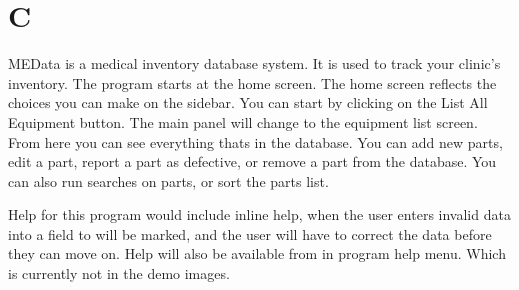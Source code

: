 \documentclass[12pt]{report}
\begin{document}
\chapter*{C}

MEData is a medical inventory database system.  It is used to track your
clinic's inventory.  The program starts at the home screen.  The home screen
reflects the choices you can make on the sidebar.  You can start by 
clicking on the List All Equipment button.  The main panel will change to 
the equipment list screen.  From here you can see everything thats in the
database.  You can add new parts, edit a part, report a part as defective,
or remove a part from the database.  You can also run searches on parts, or
sort the parts list.

Help for this program would include inline help, when the user enters
invalid data into a field to will be marked, and the user will have to
correct the data before they can move on.  Help will also be available 
from in program help menu.  Which is currently not in the demo images.
\end{document}
